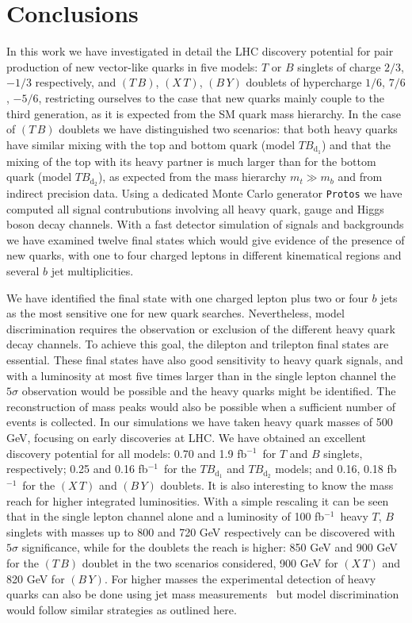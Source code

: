 \documentclass[12pt,a4paper]{article}
\newcommand{\fbin}{fb$^{-1}$}
\newcommand{\TBd}{TB_{\text{d}_1}}
\newcommand{\TBD}{TB_{\text{d}_2}}
\newcommand{\TB}{(T \, B)}
\newcommand{\XT}{(X \, T)}
\newcommand{\BY}{(B \, Y)}
\begin{document}
\section{Conclusions}
\label{sec:concl}


In this work we have investigated in detail the LHC discovery potential for pair production of new vector-like quarks in five models: $T$ or $B$ singlets of charge $2/3$, $-1/3$ respectively,
and $\TB$, $\XT$, $\BY$ doublets of hypercharge $1/6$, $7/6$, $-5/6$, restricting ourselves to the case that new quarks mainly couple to the third generation, as it is expected from the SM quark mass hierarchy. In the case of $\TB$ doublets we have distinguished two scenarios: that both heavy quarks have similar mixing with the top and bottom quark (model $\TBd$) and that the mixing of the top with its heavy partner is much larger than for the bottom quark (model $\TBD$), as expected from the mass hierarchy $m_t \gg m_b$ and from indirect precision data.
Using a dedicated Monte Carlo generator {\tt Protos} \cite{AguilarSaavedra:2008gt} we have computed all signal contrubutions involving all heavy quark, gauge and Higgs boson decay channels. With a fast detector simulation of signals and backgrounds we have examined twelve final states which would give evidence of the presence of new quarks, with one to four charged leptons in different kinematical regions and several $b$ jet multiplicities.

We have identified the final state with one charged lepton plus two or four $b$ jets as the most sensitive one for new quark searches. Nevertheless, model discrimination requires the observation or exclusion of the different heavy quark decay channels. To achieve this goal, the dilepton and trilepton final states are essential. These final states have also good sensitivity to heavy quark signals, and with a luminosity at most five times larger than in the single lepton channel the $5\sigma$ observation would be possible and the heavy quarks might be identified. The reconstruction of mass peaks would also be possible when a sufficient number of events is collected.
In our simulations we have taken heavy quark masses of 500 GeV, focusing on early discoveries at LHC. We have obtained an excellent discovery potential for all models: 
0.70 and 1.9 \fbin\ for $T$ and $B$ singlets, respectively; 0.25 and 0.16 \fbin\ for the $\TBd$ and $\TBD$ models; and 0.16, 0.18 \fbin\ for the $\XT$ and $\BY$ doublets.
It is also interesting to know the mass reach for higher integrated luminosities. With a simple rescaling it can be seen that in the single lepton channel
alone and a luminosity of 100 \fbin\ heavy $T$, $B$ singlets with masses up to 800 and 720 GeV respectively can be discovered with $5\sigma$ significance, while for the doublets the reach is higher: 850 GeV and 900 GeV for the $\TB$ doublet in the two scenarios considered, 900 GeV for $\XT$ and 820 GeV for $\BY$. For higher masses the experimental detection of heavy quarks can also be done using jet mass measurements~\cite{Skiba:2007fw} but model discrimination would follow similar strategies as outlined here.
\end{document}
